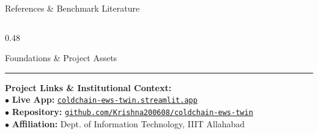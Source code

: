 \documentclass[aspectratio=169, 10pt]{beamer}
\begin{document}
\begin{frame}{References \& Benchmark Literature}
\begin{columns}[T]
\begin{column}{0.48\textwidth}
\begin{exampleblock}{Foundations \& Project Assets}
\begin{enumerate}
                \end{enumerate}
                \vspace{4pt}
                \hrule
                \vspace{4pt}
                \textbf{Project Links \& Institutional Context:}\\
                $\bullet$ \textbf{Live App:} \href{https://coldchain-ews-twin.streamlit.app/}{\texttt{coldchain-ews-twin.streamlit.app}}\\
                $\bullet$ \textbf{Repository:} \href{https://github.com/Krishna200608/coldchain-ews-twin}{\texttt{github.com/Krishna200608/coldchain-ews-twin}}\\
                $\bullet$ \textbf{Affiliation:} Dept. of Information Technology, IIIT Allahabad
            \end{exampleblock}
        \end{column}
    \end{columns}
\end{frame}
\end{document}
